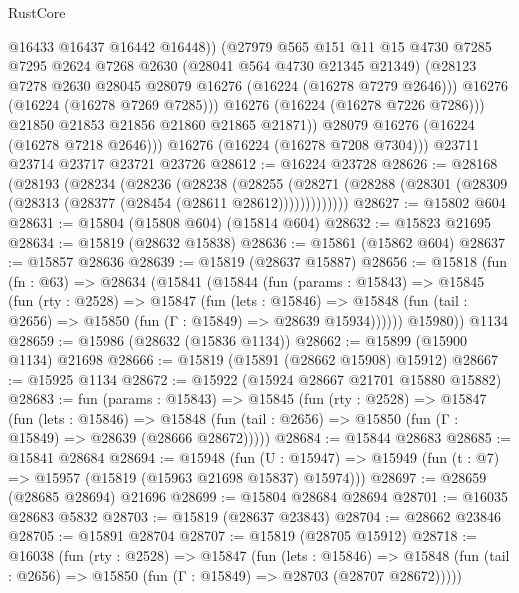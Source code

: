 \begin{lexlean}{RustCore}
\begin{coremodule}
                  @16433
                  @16437
                  @16442
                  @16448))
              (@27979
                @565
                @151
                @11
                @15
                @4730
                @7285
                @7295
                @2624
                @7268
                @2630
                (@28041 @564 @4730 @21345 @21349)
                (@28123 @7278 @2630 @28045 @28079 @16276 (@16224 (@16278 @7279 @2646)))
                @16276
                (@16224 (@16278 @7269 @7285)))
              @16276
              (@16224 (@16278 @7226 @7286)))
            @21850
            @21853
            @21856
            @21860
            @21865
            @21871))
        @28079
        @16276
        (@16224 (@16278 @7218 @2646)))
      @16276
      (@16224 (@16278 @7208 @7304)))
    @23711
    @23714
    @23717
    @23721
    @23726
@28612 := @16224 @23728
@28626 := @28168
    (@28193
      (@28234
        (@28236
          (@28238
            (@28255
              (@28271 (@28288 (@28301 (@28309 (@28313 (@28377 (@28454 (@28611 @28612)))))))))))))
@28627 := @15802 @604
@28631 := @15804 (@15808 @604) (@15814 @604)
@28632 := @15823 @21695
@28634 := @15819 (@28632 @15838)
@28636 := @15861 (@15862 @604)
@28637 := @15857 @28636
@28639 := @15819 (@28637 @15887)
@28656 := @15818
    (fun (fn : @63) =>
    @28634
      (@15841
        (@15844
          (fun (params : @15843) =>
          @15845
            (fun (rty : @2528) =>
            @15847
              (fun (lets : @15846) =>
              @15848 (fun (tail : @2656) => @15850 (fun (Γ : @15849) => @28639 @15934))))))
        @15980))
    @1134
@28659 := @15986 (@28632 (@15836 @1134))
@28662 := @15899 (@15900 @1134) @21698
@28666 := @15819 (@15891 (@28662 @15908) @15912)
@28667 := @15925 @1134
@28672 := @15922 (@15924 @28667 @21701 @15880 @15882)
@28683 := fun (params : @15843) =>
  @15845
    (fun (rty : @2528) =>
    @15847
      (fun (lets : @15846) =>
      @15848 (fun (tail : @2656) => @15850 (fun (Γ : @15849) => @28639 (@28666 @28672)))))
@28684 := @15844 @28683
@28685 := @15841 @28684
@28694 := @15948
    (fun (U : @15947) => @15949 (fun (t : @7) => @15957 (@15819 (@15963 @21698 @15837) @15974)))
@28697 := @28659 (@28685 @28694) @21696
@28699 := @15804 @28684 @28694
@28701 := @16035 @28683 @5832
@28703 := @15819 (@28637 @23843)
@28704 := @28662 @23846
@28705 := @15891 @28704
@28707 := @15819 (@28705 @15912)
@28718 := @16038
    (fun (rty : @2528) =>
    @15847
      (fun (lets : @15846) =>
      @15848 (fun (tail : @2656) => @15850 (fun (Γ : @15849) => @28703 (@28707 @28672)))))

\end{coremodule}
\end{lexlean}

